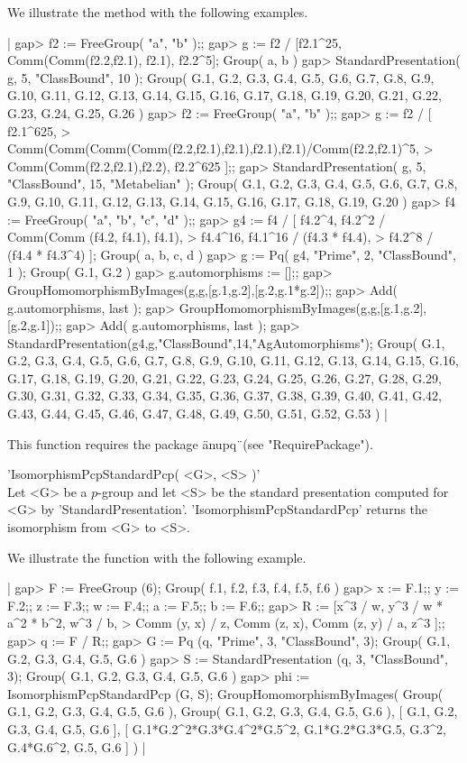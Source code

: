 We illustrate the method with the following examples.

|    gap> f2 := FreeGroup( "a", "b" );;
    gap> g := f2 / [f2.1^25, Comm(Comm(f2.2,f2.1), f2.1), f2.2^5];
    Group( a, b )
    gap> StandardPresentation( g, 5, "ClassBound", 10 );
    Group( G.1, G.2, G.3, G.4, G.5, G.6, G.7, G.8, G.9, G.10, G.11, G.12,
    G.13, G.14, G.15, G.16, G.17, G.18, G.19, G.20, G.21, G.22, G.23,
    G.24, G.25, G.26 )
    gap> f2 := FreeGroup( "a", "b" );;
    gap> g := f2 / [ f2.1^625,
    >  Comm(Comm(Comm(Comm(f2.2,f2.1),f2.1),f2.1),f2.1)/Comm(f2.2,f2.1)^5,
    >  Comm(Comm(f2.2,f2.1),f2.2), f2.2^625 ];;
    gap> StandardPresentation( g, 5, "ClassBound", 15, "Metabelian" );
    Group( G.1, G.2, G.3, G.4, G.5, G.6, G.7, G.8, G.9, G.10, G.11, G.12,
    G.13, G.14, G.15, G.16, G.17, G.18, G.19, G.20 )
    gap> f4 := FreeGroup( "a", "b", "c", "d" );;
    gap> g4 := f4 / [ f4.2^4, f4.2^2 / Comm(Comm (f4.2, f4.1), f4.1),
    >                f4.4^16, f4.1^16 / (f4.3 * f4.4),
    >                f4.2^8 / (f4.4 * f4.3^4) ];
    Group( a, b, c, d )
    gap> g := Pq( g4, "Prime", 2, "ClassBound", 1 );
    Group( G.1, G.2 )
    gap> g.automorphisms := [];;
    gap> GroupHomomorphismByImages(g,g,[g.1,g.2],[g.2,g.1*g.2]);;
    gap> Add( g.automorphisms, last );
    gap> GroupHomomorphismByImages(g,g,[g.1,g.2],[g.2,g.1]);;
    gap> Add( g.automorphisms, last );
    gap> StandardPresentation(g4,g,"ClassBound",14,"AgAutomorphisms");
    Group( G.1, G.2, G.3, G.4, G.5, G.6, G.7, G.8, G.9, G.10, G.11, G.12,
    G.13, G.14, G.15, G.16, G.17, G.18, G.19, G.20, G.21, G.22, G.23,
    G.24, G.25, G.26, G.27, G.28, G.29, G.30, G.31, G.32, G.33, G.34,
    G.35, G.36, G.37, G.38, G.39, G.40, G.41, G.42, G.43, G.44, G.45,
    G.46, G.47, G.48, G.49, G.50, G.51, G.52, G.53 ) |

This function requires the package \"anupq\"\ (see "RequirePackage").


'IsomorphismPcpStandardPcp( <G>, <S>  )' \\

Let  <G> be  a  $p$-group and  let <S>  be  the  standard presentation
computed for <G> by 'StandardPresentation'. 'IsomorphismPcpStandardPcp'
returns the isomorphism from <G> to <S>.

We illustrate the function with the following example.

|    gap> F := FreeGroup (6);
    Group( f.1, f.2, f.3, f.4, f.5, f.6 )
    gap> x := F.1;; y := F.2;; z := F.3;; w := F.4;; a := F.5;; b := F.6;;
    gap> R := [x^3 / w, y^3 / w * a^2 * b^2, w^3 / b,
    >             Comm (y, x) / z, Comm (z, x), Comm (z, y) / a, z^3 ];;
    gap> q := F / R;;
    gap> G := Pq (q, "Prime", 3, "ClassBound", 3);
    Group( G.1, G.2, G.3, G.4, G.5, G.6 )
    gap> S := StandardPresentation (q, 3, "ClassBound", 3);
    Group( G.1, G.2, G.3, G.4, G.5, G.6 )
    gap> phi := IsomorphismPcpStandardPcp (G, S);
    GroupHomomorphismByImages( Group( G.1, G.2, G.3, G.4, G.5,
    G.6 ), Group( G.1, G.2, G.3, G.4, G.5, G.6 ),
    [ G.1, G.2, G.3, G.4, G.5, G.6 ],
    [ G.1*G.2^2*G.3*G.4^2*G.5^2, G.1*G.2*G.3*G.5, G.3^2, G.4*G.6^2, G.5,
      G.6 ] ) |

